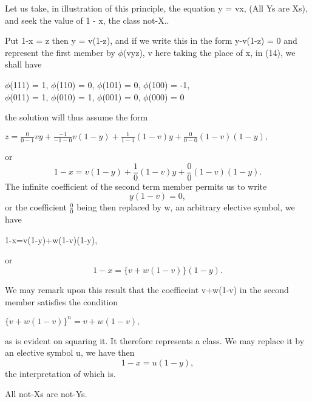 \documentclass{article}
\begin{document}
{{{{\hspace{.2in}
Let us take, in illustration of this principle, the equation y = vx, (All Ys are
Xs), and seek the value of 1 - x, the class not-X..\vspace{.05in}

\hspace{.2in}

Put 1-x = z then y = v(1-z), and if we write this in the form y-v(1-z) = 0
and represent the first member by $\phi$(vyz), v here taking the place of x, in (14),
we shall have
\begin{center}
$\phi$(111) = 1,  $\phi$(110) = 0,  $\phi$(101) = 0,  $\phi$(100) = -1,\vspace{.05in}\\
$\phi$(011) = 1,  $\phi$(010) = 1,  $\phi$(001) = 0,  $\phi$(000) = 0\end{center}
the solution will thus assume the form
\begin{center}$z=\frac{0}{0-1}vy+\frac{-1}{-1-0}v(1-y)+\frac{1}{1-1}(1-v)y+\frac{0}{0-0}(1-v)(1-y),$\end{center}
or
\begin{equation}1-x=v(1-y)+\frac{1}{0}(1-v)y+\frac{0}{0}(1-v)(1-y).\end{equation}
The infinite coefficient of the second term member permits us to write
\begin{equation}y(1-v)=0,\end{equation}
or
the coefficient $\frac{0}{0}$
being then replaced by w, an arbitrary elective symbol, we have
\begin{center}1-x=v(1-y)+w(1-v)(1-y),\end{center}
or
\begin{equation}1-x=\{v+w(1-v)\}(1-y).\end{equation}

We may remark upon this result that the coefficeint  v+w(1-v) in the second member satisfies the condition
\begin{center}$ \{v+w(1-v)\}^n = v+w(1-v),$\end{center}
as is evident on squaring it. It therefore represents a class. We may replace it
by an elective symbol u, we have then
\begin{equation}1-x = u(1-y),\end{equation}
the interpretation of which is.\vspace{.05in}

\hspace{.2in}
All not-Xs are not-Ys.\vspace{.1in}\\

}}}}
\end{document}
